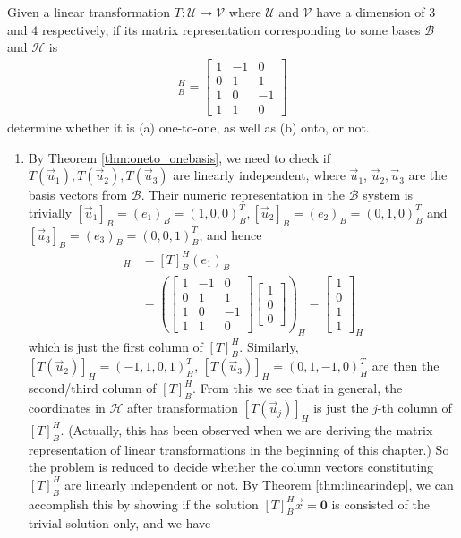 \begin{exmp}
Given a linear transformation $T: \mathcal{U} \to \mathcal{V}$ where $\mathcal{U}$ and $\mathcal{V}$ have a dimension of $3$ and $4$ respectively, if its matrix representation corresponding to some bases $\mathcal{B}$ and $\mathcal{H}$ is
\begin{align*}
[T]_B^H =
\begin{bmatrix}
1 & -1 & 0 \\
0 & 1 & 1 \\
1 & 0 & -1 \\
1 & 1 & 0
\end{bmatrix}
\end{align*}
determine whether it is (a) one-to-one, as well as (b) onto, or not.
\end{exmp}
\begin{solution}
\begin{enumerate}[label=(\alph*)]
    \item By Theorem \ref{thm:oneto_onebasis}, we need to check if $T(\vec{u}_1), T(\vec{u}_2), T(\vec{u}_3)$ are linearly independent, where $\vec{u}_1$, $\vec{u}_2, \vec{u}_3$ are the basis vectors from $\mathcal{B}$. Their numeric representation in the $\mathcal{B}$ system is trivially $[\vec{u}_1]_B = (e_1)_B = (1,0,0)_B^T, [\vec{u}_2]_B = (e_2)_B = (0,1,0)_B^T$ and $[\vec{u}_3]_B = (e_3)_B = (0,0,1)_B^T$, and hence
    \begin{align*}
    [T(\vec{u}_1)]_H &= [T]_B^H(e_1)_B \\
    &= 
    \left(\begin{bmatrix}
    1 & -1 & 0 \\
    0 & 1 & 1 \\
    1 & 0 & -1 \\
    1 & 1 & 0
    \end{bmatrix}
    \begin{bmatrix}
    1 \\
    0 \\
    0
    \end{bmatrix}\right)_H = 
    \begin{bmatrix}
    1 \\
    0 \\
    1 \\
    1
    \end{bmatrix}_H
    \end{align*}
    which is just the first column of $[T]_B^H$. Similarly, $[T(\vec{u}_2)]_H = (-1,1,0,1)_H^T$, $[T(\vec{u}_3)]_H = (0,1,-1,0)_H^T$ are then the second/third column of $[T]_B^H$. From this we see that in general, the coordinates in $\mathcal{H}$ after transformation $[T(\vec{u}_j)]_H$ is just the $j$-th column of $[T]_B^H$. (Actually, this has been observed when we are deriving the matrix representation of linear transformations in the beginning of this chapter.) So the problem is reduced to decide whether the column vectors constituting $[T]_B^H$ are linearly independent or not. By Theorem \ref{thm:linearindep}, we can accomplish this by showing if the solution $[T]_B^H\vec{x} = \textbf{0}$ is consisted of the trivial solution only, and we have

\end{enumerate}
\end{solution}
